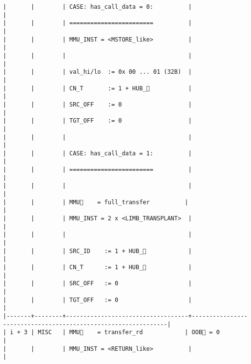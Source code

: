 \documentclass[varwidth=\maxdimen,margin=0.5cm,multi={verbatim}]{standalone}
\begin{document}
\begin{verbatim}
|       |        | CASE: has_call_data = 0:          |                                                               |
|       |        | ========================          |                                                               |
|       |        | MMU_INST = <MSTORE_like>          |                                                               |
|       |        |                                   |                                                               |
|       |        | val_hi/lo  := 0x 00 ... 01 (32B)  |                                                               |
|       |        | CN_T       := 1 + HUB_           |                                                               |
|       |        | SRC_OFF    := 0                   |                                                               |
|       |        | TGT_OFF    := 0                   |                                                               |
|       |        |                                   |                                                               |
|       |        | CASE: has_call_data = 1:          |                                                               |
|       |        | ========================          |                                                               |
|       |        |                                   |                                                               |
|       |        | MMU🚩    = full_transfer          |                                                               |
|       |        | MMU_INST = 2 x <LIMB_TRANSPLANT>  |                                                               |
|       |        |                                   |                                                               |
|       |        | SRC_ID    := 1 + HUB_            |                                                               |
|       |        | CN_T      := 1 + HUB_            |                                                               |
|       |        | SRC_OFF   := 0                    |                                                               |
|       |        | TGT_OFF   := 0                    |                                                               |
|-------+--------+-----------------------------------+---------------------------------------------------------------|
| i + 3 | MISC   | MMU🚩    = transfer_rd            | OOB🚩 = 0                                                     |
|       |        | MMU_INST = <RETURN_like>          |                                                               |

\end{verbatim}
\end{document}
